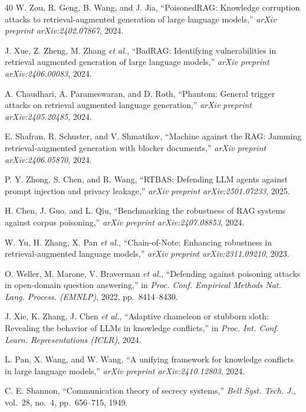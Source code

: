 \documentclass[journal,10pt]{IEEEtran}
\begin{document}
\begin{thebibliography}{40}
 W. Zou, R. Geng, B. Wang, and J. Jia, ``PoisonedRAG: Knowledge corruption attacks to retrieval-augmented generation of large language models,'' \emph{arXiv preprint arXiv:2402.07867}, 2024.

 J. Xue, Z. Zheng, M. Zhang \emph{et al.}, ``BadRAG: Identifying vulnerabilities in retrieval augmented generation of large language models,'' \emph{arXiv preprint arXiv:2406.00083}, 2024.

 A. Chaudhari, A. Parameswaran, and D. Roth, ``Phantom: General trigger attacks on retrieval augmented language generation,'' \emph{arXiv preprint arXiv:2405.20485}, 2024.

 E. Shafran, R. Schuster, and V. Shmatikov, ``Machine against the RAG: Jamming retrieval-augmented generation with blocker documents,'' \emph{arXiv preprint arXiv:2406.05870}, 2024.

 P. Y. Zhong, S. Chen, and R. Wang, ``RTBAS: Defending LLM agents against prompt injection and privacy leakage,'' \emph{arXiv preprint arXiv:2501.07233}, 2025.

 H. Chen, J. Guo, and L. Qiu, ``Benchmarking the robustness of RAG systems against corpus poisoning,'' \emph{arXiv preprint arXiv:2407.08853}, 2024.

 W. Yu, H. Zhang, X. Pan \emph{et al.}, ``Chain-of-Note: Enhancing robustness in retrieval-augmented language models,'' \emph{arXiv preprint arXiv:2311.09210}, 2023.

 O. Weller, M. Marone, V. Braverman \emph{et al.}, ``Defending against poisoning attacks in open-domain question answering,'' in \emph{Proc. Conf. Empirical Methods Nat. Lang. Process. (EMNLP)}, 2022, pp.\ 8414--8430.

 J. Xie, K. Zhang, J. Chen \emph{et al.}, ``Adaptive chameleon or stubborn sloth: Revealing the behavior of LLMs in knowledge conflicts,'' in \emph{Proc. Int. Conf. Learn. Representations (ICLR)}, 2024.

 L. Pan, X. Wang, and W. Wang, ``A unifying framework for knowledge conflicts in large language models,'' \emph{arXiv preprint arXiv:2410.12803}, 2024.

 C. E. Shannon, ``Communication theory of secrecy systems,'' \emph{Bell Syst. Tech. J.}, vol.~28, no.~4, pp.\ 656--715, 1949.


\end{thebibliography}
\end{document}
